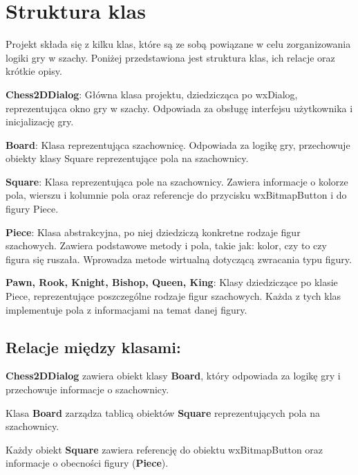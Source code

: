 \documentclass[]{report}
\begin{document}
\section*{Struktura klas}

Projekt składa się z kilku klas, które są ze sobą powiązane w celu zorganizowania logiki gry w szachy. Poniżej przedstawiona jest struktura klas, ich relacje oraz krótkie opisy.\vspace{\baselineskip}

\textbf{Chess2DDialog}: Główna klasa projektu, dziedzicząca po wxDialog, reprezentująca okno gry w szachy. Odpowiada za obsługę interfejsu użytkownika i inicjalizację gry.\vspace{\baselineskip}

\textbf{Board}: Klasa reprezentująca szachownicę. Odpowiada za logikę gry, przechowuje obiekty klasy Square reprezentujące pola na szachownicy.\vspace{\baselineskip}

\textbf{Square}: Klasa reprezentująca pole na szachownicy. Zawiera informacje o kolorze pola, wierszu i kolumnie pola oraz referencje do przycisku wxBitmapButton i do figury Piece.\vspace{\baselineskip}

\textbf{Piece}: Klasa abstrakcyjna, po niej dziedziczą konkretne rodzaje figur szachowych. Zawiera podstawowe metody i pola, takie jak: kolor, czy to czy figura się ruszała. Wprowadza metode wirtualną dotyczącą zwracania typu figury.\vspace{\baselineskip}

\textbf{Pawn, Rook, Knight, Bishop, Queen, King}: Klasy dziedziczące po klasie Piece, reprezentujące poszczególne rodzaje figur szachowych. Każda z tych klas implementuje pola z informacjami na temat danej figury.

\subsection*{Relacje między klasami:}

\textbf{Chess2DDialog} zawiera obiekt klasy \textbf{Board}, który odpowiada za logikę gry i przechowuje informacje o szachownicy.\vspace{\baselineskip}

Klasa \textbf{Board} zarządza tablicą obiektów \textbf{Square} reprezentujących pola na szachownicy.\vspace{\baselineskip}

Każdy obiekt \textbf{Square} zawiera referencję do obiektu wxBitmapButton oraz informacje o obecności figury (\textbf{Piece}).\vspace{\baselineskip}
\end{document}
